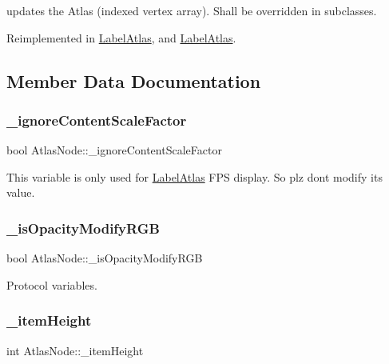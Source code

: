 updates the Atlas (indexed vertex array). Shall be overridden in subclasses. 

Reimplemented in \hyperlink{classLabelAtlas_a0075a4071c6da704b665bca30393ac5b}{Label\+Atlas}, and \hyperlink{classLabelAtlas_af70aa9b7820b00dfc6aa2c7291532fd6}{Label\+Atlas}.



\subsection{Member Data Documentation}
\mbox{\label{classAtlasNode_adae4072d6a5781ce11712b376679ea2b}} 
\subsubsection{\texorpdfstring{\+\_\+ignore\+Content\+Scale\+Factor}{\_ignoreContentScaleFactor}}
{\footnotesize\ttfamily bool Atlas\+Node\+::\+\_\+ignore\+Content\+Scale\+Factor\hspace{0.3cm}{\ttfamily [protected]}}

This variable is only used for \hyperlink{classLabelAtlas}{Label\+Atlas} F\+PS display. So plz don\textquotesingle{}t modify its value. \mbox{\label{classAtlasNode_ac983ebe69b7021fa28bb0726ebcf3e00}} 
\subsubsection{\texorpdfstring{\+\_\+is\+Opacity\+Modify\+R\+GB}{\_isOpacityModifyRGB}}
{\footnotesize\ttfamily bool Atlas\+Node\+::\+\_\+is\+Opacity\+Modify\+R\+GB\hspace{0.3cm}{\ttfamily [protected]}}

Protocol variables. \mbox{\label{classAtlasNode_a95aae51f9baec3ddb372ed1e8ee16cd1}} 
\subsubsection{\texorpdfstring{\+\_\+item\+Height}{\_itemHeight}}
{\footnotesize\ttfamily int Atlas\+Node\+::\+\_\+item\+Height\hspace{0.3cm}{\ttfamily [protected]}}

